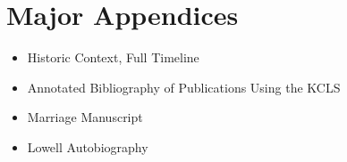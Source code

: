 \documentclass[a4paper,man,apacite,natbib,12pt]{apa6}\usepackage[]{graphicx}\usepackage[]{color}
\newlength{\wideitemsep}
\let\olditem\item
\renewcommand{\item}{\setlength{\itemsep}{\wideitemsep}\olditem}
\begin{document}
\section{Major Appendices}
\begin{itemize}
\item Historic Context, Full Timeline
\item Annotated Bibliography of Publications Using the KCLS
\item Marriage Manuscript
\item Lowell Autobiography
\end{itemize}
\pagebreak\label{bibliography}
\appendix\label{appen}\pagebreak{}
%








\end{document}
